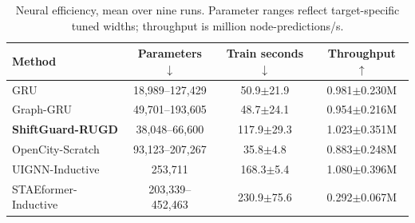 \begin{table}[t]
\centering
\caption{Neural efficiency, mean over nine runs. Parameter ranges reflect target-specific tuned widths; throughput is million node-predictions/s.}
\label{tab:efficiency}
\begin{tabular}{lccc}
\toprule
Method & Parameters $\downarrow$ & Train seconds $\downarrow$ & Throughput $\uparrow$ \\
\midrule
GRU & 18,989--127,429 & 50.9$\pm$21.9 & 0.981$\pm$0.230M \\
Graph-GRU & 49,701--193,605 & 48.7$\pm$24.1 & 0.954$\pm$0.216M \\
\textbf{ShiftGuard-RUGD} & 38,048--66,600 & 117.9$\pm$29.3 & 1.023$\pm$0.351M \\
OpenCity-Scratch & 93,123--207,267 & 35.8$\pm$4.8 & 0.883$\pm$0.248M \\
UIGNN-Inductive & 253,711 & 168.3$\pm$5.4 & 1.080$\pm$0.396M \\
STAEformer-Inductive & 203,339--452,463 & 230.9$\pm$75.6 & 0.292$\pm$0.067M \\
\bottomrule
\end{tabular}
\end{table}
